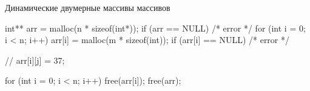 \begin{frame}[fragile]{Динамические двумерные массивы массивов}

  \begin{clisting}
    int** arr = malloc(n * sizeof(int*));
    if (arr == NULL) { /* error */ }
    for (int i = 0; i < n; i++) {
        arr[i] = malloc(m * sizeof(int));
        if (arr[i] == NULL) { /* error */ }
    }

    // arr[i][j] = 37;

    for (int i = 0; i < n; i++) {
        free(arr[i]);
    }
    free(arr);
  \end{clisting}

\end{frame}





